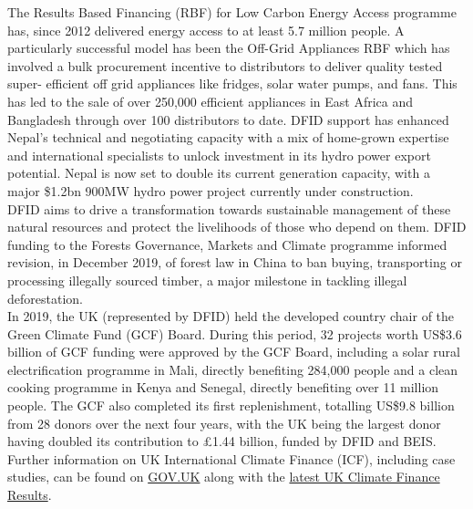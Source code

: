 The Results Based Financing (RBF) for Low Carbon Energy Access programme has, since 2012 delivered energy access to at least 5.7 million people. %
A particularly successful model has been the Off-Grid Appliances RBF which has involved a bulk procurement incentive to distributors to deliver quality tested super- efficient off grid appliances like fridges, solar water pumps, and fans. This has led to the sale of over 250,000 efficient appliances in East Africa and Bangladesh through over 100 distributors to date. %
DFID support has enhanced Nepal's technical and negotiating capacity with a mix of home-grown expertise and international specialists to unlock investment in its hydro power export potential. %
Nepal is now set to double its current generation capacity, with a major \$1.2bn 900MW hydro power project currently under construction. \\%

DFID aims to drive a transformation towards sustainable management of these natural resources and protect the livelihoods of those who depend on them. %
DFID funding to the Forests Governance, Markets and Climate programme informed revision, in December 2019, of forest law in China to ban buying, transporting or processing illegally sourced timber, a major milestone in tackling illegal deforestation. \\%

In 2019, the UK (represented by DFID) held the developed country chair of the Green Climate Fund (GCF) Board. %
During this period, 32 projects worth US\$3.6 billion of GCF funding were approved by the GCF Board, including a solar rural electrification programme in Mali, directly benefiting 284,000 people and a clean cooking programme in Kenya and Senegal, directly benefiting over 11 million people. %
The GCF also completed its first replenishment, totalling US\$9.8 billion from 28 donors over the next four years, with the UK being the largest donor having doubled its contribution to \pounds 1.44 billion, funded by DFID and BEIS. \\%

Further information on UK International Climate Finance (ICF), including case studies, can be found on \href{https://www.gov.uk/guidance/international-climate-finance#our-portfolio-across-the-world}{GOV.UK} along with the \href{https://www.gov.uk/government/publications/uk-climate-finance-results}{latest UK Climate Finance Results}. %


\newpage
